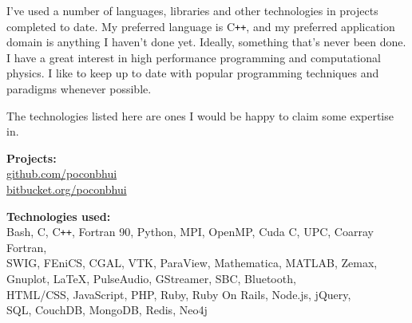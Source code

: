 \documentclass[11pt]{article}
\newcommand{\resumeSection}[1]{
    \par
    \vspace{\baselineskip}
    \large {\sc {#1}}
    \par
    \vspace{-0.9\baselineskip}
    \hrulefill
    \vspace{0.5\baselineskip}
    \par
}
\newenvironment{resumeSubSectionBody}{
    \par
    \vspace{-0.8\parskip}
    \begin{small}
    \par
} {
    \par
    \end{small}
    \par
}
\begin{document}
%
%
\begin{resumeSubSectionBody}

    I've used a number of languages, libraries and other technologies in
    projects completed to date. My preferred language is C\verb!++!,
    and my preferred application domain is anything I haven't done yet.
    Ideally, something that's never been done.
    I have a great interest in high performance programming
    and computational physics.
    I like to keep up to date with popular programming techniques and paradigms
    whenever possible.

    The technologies listed here are ones I would be happy to claim some
    expertise in.

    \begin{description}
        \item{\bf Projects:} \\
            \href{https://github.com/poconbhui}{github.com/poconbhui} \\
            \href{https://bitbucket.org/poconbhui}{bitbucket.org/poconbhui}

        \item{\bf Technologies used:} \\
            Bash, C, C\verb!++!, Fortran 90, Python,
            MPI, OpenMP, Cuda C, UPC, Coarray Fortran,
            \\
            SWIG, FEniCS, CGAL, VTK, ParaView,
            Mathematica, MATLAB, Zemax, Gnuplot, LaTeX,
            PulseAudio, GStreamer, SBC, Bluetooth,
            \\
            HTML/CSS, JavaScript, PHP, Ruby,
            Ruby On Rails, Node.js, jQuery,
            \\
            SQL, CouchDB, MongoDB, Redis, Neo4j
    \end{description}

\end{resumeSubSectionBody}




\resumeSection{Education \& Training}
\end{document}
